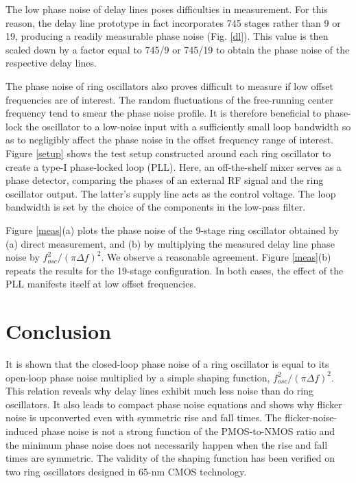 The low phase noise of delay lines poses difficulties in measurement. For this reason, the delay line prototype in fact incorporates 745 stages rather than 9 or 19,
producing a readily measurable phase noise (Fig. \ref{dl}). This value is then scaled down by a factor equal to 745/9 or 745/19 to obtain the phase noise of the
respective delay lines.


The phase noise of ring oscillators also proves difficult to measure if low offset frequencies are of interest. The random fluctuations of the free-running center frequency
tend to smear the phase noise profile. It is therefore beneficial to phase-lock the oscillator to a low-noise input with a sufficiently small loop bandwidth so as
to negligibly affect the phase noise in the offset frequency range of interest. Figure \ref{setup} shows the test setup constructed around each ring oscillator to create
a type-I phase-locked loop (PLL).
Here, an off-the-shelf mixer serves as a phase detector, comparing the phases of an external RF signal and the ring oscillator output. The latter's supply line acts
as the control voltage. 
The loop bandwidth is set by the choice of the components in the low-pass filter.

Figure \ref{meas}(a) plots the phase noise of the 9-stage ring oscillator obtained by (a) direct measurement, and (b) by multiplying the measured delay line phase noise
by $f_{osc}^2/(\pi \Delta f)^2$. We observe a reasonable agreement. Figure \ref{meas}(b) repeats the results for the 19-stage configuration. In both cases, the effect of
the PLL manifests itself at low offset frequencies.
 
 



\section{Conclusion}

It is shown that the closed-loop phase noise of a ring oscillator is equal to its open-loop phase noise multiplied by a simple shaping function, $f_{osc}^2/(\pi \Delta f)^2$. This relation
reveals why delay lines exhibit much less noise than do ring oscillators. It also leads to compact phase noise equations and shows why flicker noise is
upconverted even with symmetric rise and fall times. The flicker-noise-induced phase noise is not a strong function of the PMOS-to-NMOS ratio and the minimum phase noise
does not necessarily happen when the rise and fall times are symmetric.
The validity of the shaping function has been verified on two ring oscillators designed in 65-nm CMOS technology.


